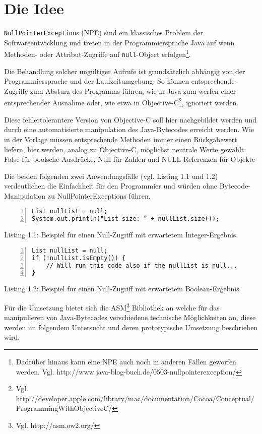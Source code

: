 
\chapter{Die Idee}

\texttt{NullPointerException}s (NPE) sind ein klassisches Problem der Softwareentwicklung
und treten in der Programmiersprache Java auf wenn Methoden- oder Attribut-Zugriffe
auf \texttt{null}-Object erfolgen\footnote{Dadrüber hinaus kann eine NPE auch
noch in anderen Fällen geworfen werden. Vgl. http://www.java-blog-buch.de/0503-nullpointerexception/}.

Die Behandlung solcher ungültiger Aufrufe ist grundsätzlich abhängig von der
Programmiersprache und der Laufzeitumgebung. So können entsprechende Zugriffe
zum Absturz des Programms führen, wie in Java zum werfen einer entsprechender
Ausnahme oder, wie etwa in Objective-C\footnote{Vgl. http://developer.apple.com/library/mac/documentation/Cocoa/Conceptual/ProgrammingWithObjectiveC/}, ignoriert werden.

Diese fehlertolerantere Version von Objective-C soll hier nachgebildet werden
und durch eine automatisierte manipulation des Java-Bytecodes erreicht werden.
Wie in der Vorlage müssen entsprechende Methoden immer einen Rückgabewert liefern,
hier werden, analog zu Objective-C, möglichst neutrale Werte gewählt:
False für boolsche Ausdrücke, Null für Zahlen und NULL-Referenzen für Objekte

Die beiden folgenden zwei Anwendungsfälle (vgl. Listing 1.1 und 1.2) verdeutlichen
die Einfachheit für den Programmier und würden ohne Bytecode-Manipulation
zu NullPointerExceptions führen.

\begin{lstlisting}[basicstyle=\ttfamily,numbers=left,numberstyle=\footnotesize\ttfamily,backgroundcolor=\color{source}]
List nullList = null;
System.out.println("List size: " + nullList.size());
\end{lstlisting}
\centerline{Listing 1.1: Beispiel für einen Null-Zugriff mit erwartetem Integer-Ergebnis}

\vspace{0.3cm}

\begin{lstlisting}[basicstyle=\ttfamily,numbers=left,numberstyle=\footnotesize\ttfamily,backgroundcolor=\color{source}]
List nullList = null;
if (!nullList.isEmpty()) {
	// Will run this code also if the nullList is null...
}
\end{lstlisting}
\centerline{Listing 1.2: Beispiel für einen Null-Zugriff mit erwartetem Boolean-Ergebnis}

\vspace{0.3cm}

Für die Umsetzung bietet sich die ASM\footnote{Vgl. http://asm.ow2.org/} Bibliothek
an welche für das manipulieren von Java-Bytecodes verschiedene technische Möglichkeiten an,
diese werden im folgendem Untersucht und deren prototypische Umsetzung beschrieben wird.

